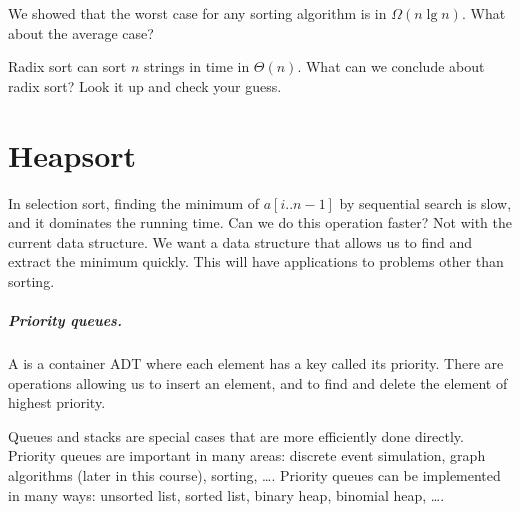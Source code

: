 We showed that the worst case for any sorting algorithm is in $\Omega (n \lg n)$. What about the average case?

\begin{Boxample}[1]
Radix sort can sort $n$ strings in time in $\Theta(n)$.
 What can we conclude about radix sort? Look it up and check your guess.
\end{Boxample}



\chapter{Heapsort} %
\label{sec:heapsort}

In selection sort, finding the minimum of $a[i..n-1]$ by sequential 
search is slow, and it dominates the running time. Can we do this operation 
faster?
Not with the current data structure. 
We want a data structure that allows us to find and extract the minimum quickly. 
This will have applications to problems other than sorting.


\paragraph{Priority queues.}
\begin{Definition}
A  is a container ADT where each element 
has a key called its priority. There are operations allowing us to insert an 
element, and to find and delete the element of highest priority. 
\end{Definition}
Queues and stacks are special cases that are more efficiently done directly.
Priority queues are important in many areas: discrete event simulation, 
graph algorithms (later in this course), sorting, \dots .
Priority queues can be implemented in many ways: unsorted list, sorted 
list, binary heap, binomial heap, \dots . 

